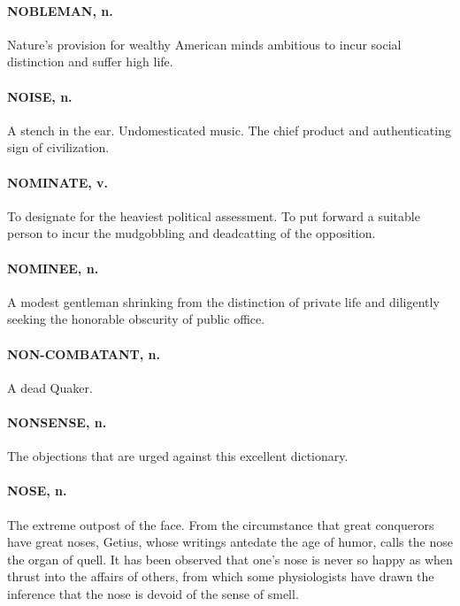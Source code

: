 \documentclass[11pt]{article}
\begin{document}
\paragraph{NOBLEMAN, n.}  Nature's provision for wealthy American minds ambitious
to incur social distinction and suffer high life.

\paragraph{NOISE, n.}  A stench in the ear.  Undomesticated music.  The chief
product and authenticating sign of civilization.

\paragraph{NOMINATE, v.}  To designate for the heaviest political assessment.  To
put forward a suitable person to incur the mudgobbling and deadcatting
of the opposition.

\paragraph{NOMINEE, n.}  A modest gentleman shrinking from the distinction of
private life and diligently seeking the honorable obscurity of public
office.

\paragraph{NON-COMBATANT, n.}  A dead Quaker.

\paragraph{NONSENSE, n.}  The objections that are urged against this excellent
dictionary.

\paragraph{NOSE, n.}  The extreme outpost of the face.  From the circumstance that
great conquerors have great noses, Getius, whose writings antedate the
age of humor, calls the nose the organ of quell.  It has been observed
that one's nose is never so happy as when thrust into the affairs of
others, from which some physiologists have drawn the inference that
the nose is devoid of the sense of smell.
\end{document}
